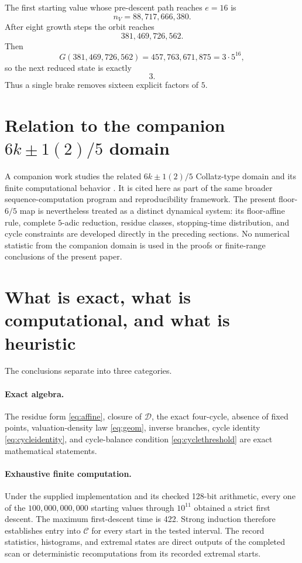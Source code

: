 \documentclass[11pt]{article}
\theoremstyle{definition}
\newcommand{\Cyc}{\mathcal{C}}
\newcommand{\D}{\mathcal{D}}
\newcommand{\Nscan}{100{,}000{,}000{,}000}
\begin{document}
The first starting value whose pre-descent path reaches $e=16$ is
\[
n_V=88{,}717{,}666{,}380.
\]
After eight growth steps the orbit reaches
\[
381{,}469{,}726{,}562.
\]
Then
\[
G(381{,}469{,}726{,}562)
=
457{,}763{,}671{,}875
=
3\cdot5^{16},
\]
so the next reduced state is exactly
\[
3.
\]
Thus a single brake removes sixteen explicit factors of $5$.

\section{Relation to the companion $6k\pm1(2)/5$ domain}

A companion work studies the related $6k\pm1(2)/5$ Collatz-type domain and its finite computational behavior \cite{BanazadehCompanion}. It is cited here as part of the same broader sequence-computation program and reproducibility framework. The present floor-$6/5$ map is nevertheless treated as a distinct dynamical system: its floor-affine rule, complete $5$-adic reduction, residue classes, stopping-time distribution, and cycle constraints are developed directly in the preceding sections. No numerical statistic from the companion domain is used in the proofs or finite-range conclusions of the present paper.

\section{What is exact, what is computational, and what is heuristic}

The conclusions separate into three categories.

\paragraph{Exact algebra.}
The residue form \eqref{eq:affine}, closure of $\D$, the exact four-cycle, absence of fixed points, valuation-density law \eqref{eq:geom}, inverse branches, cycle identity \eqref{eq:cycleidentity}, and cycle-balance condition \eqref{eq:cyclethreshold} are exact mathematical statements.

\paragraph{Exhaustive finite computation.}
Under the supplied implementation and its checked 128-bit arithmetic, every one of the $\Nscan$ starting values through $10^{11}$ obtained a strict first descent. The maximum first-descent time is 422. Strong induction therefore establishes entry into $\Cyc$ for every start in the tested interval. The record statistics, histograms, and extremal states are direct outputs of the completed scan or deterministic recomputations from its recorded extremal starts.
\end{document}
